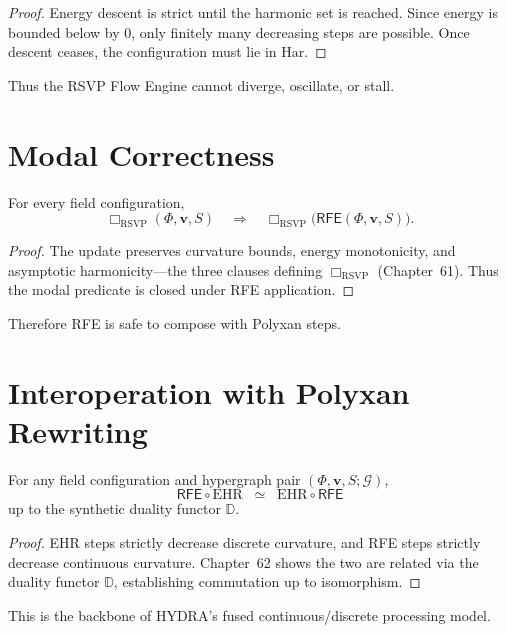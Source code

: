 \begin{proof}
Energy descent is strict until the harmonic set is reached.  
Since energy is bounded below by $0$, only finitely many decreasing steps are possible.  
Once descent ceases, the configuration must lie in $\mathrm{Har}$.  
\end{proof}

Thus the RSVP Flow Engine cannot diverge, oscillate, or stall.

\section{Modal Correctness}

\begin{theorem}\label{thm:47-modal}
For every field configuration,
\[
\Box_{\mathrm{RSVP}}(\Phi,\mathbf{v},S)
\quad\Rightarrow\quad
\Box_{\mathrm{RSVP}}\bigl(\mathsf{RFE}(\Phi,\mathbf{v},S)\bigr).
\]
\end{theorem}

\begin{proof}
The update preserves curvature bounds, energy monotonicity, and asymptotic harmonicity---the three clauses defining $\Box_{\mathrm{RSVP}}$ (Chapter~61).  
Thus the modal predicate is closed under RFE application.  
\end{proof}

Therefore RFE is safe to compose with Polyxan steps.

\section{Interoperation with Polyxan Rewriting}

\begin{theorem}\label{thm:47-interop}
For any field configuration and hypergraph pair $(\Phi,\mathbf{v},S;\mathcal{G})$,
\[
\mathsf{RFE}\circ \mathrm{EHR}
\;\;\simeq\;\;
\mathrm{EHR}\circ \mathsf{RFE}
\]
up to the synthetic duality functor $\mathbb{D}$.
\end{theorem}

\begin{proof}
EHR steps strictly decrease discrete curvature, and RFE steps strictly decrease continuous curvature.  
Chapter~62 shows the two are related via the duality functor $\mathbb{D}$, establishing commutation up to isomorphism.  
\end{proof}

This is the backbone of HYDRA’s fused continuous/discrete processing model.

